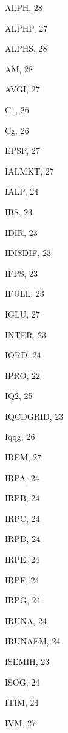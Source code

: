 \documentclass[10pt]{article} \usepackage{dina4}
\begin{document}
\begin{theindex}

  \item ALPH, 28
  \item ALPHP, 27
  \item ALPHS, 28
  \item AM, 28
  \item AVGI, 27

  \indexspace

  \item C1, 26
  \item Cg, 26

  \indexspace

  \item EPSP, 27

  \indexspace

  \item IALMKT, 27
  \item IALP, 24
  \item IBS, 23
  \item IDIR, 23
  \item IDISDIF, 23
  \item IFPS, 23
  \item IFULL, 23
  \item IGLU, 27
  \item INTER, 23
  \item IORD, 24
  \item IPRO, 22
  \item IQ2, 25
  \item IQCDGRID, 23
  \item Iqqg, 26
  \item IREM, 27
  \item IRPA, 24
  \item IRPB, 24
  \item IRPC, 24
  \item IRPD, 24
  \item IRPE, 24
  \item IRPF, 24
  \item IRPG, 24
  \item IRUNA, 24
  \item IRUNAEM, 24
  \item ISEMIH, 23
  \item ISOG, 24
  \item ITIM, 24
  \item IVM, 27

  \indexspace


\end{theindex}
\end{document}
